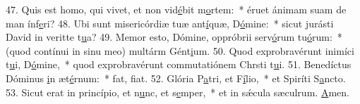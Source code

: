 47. Quis est homo, qui vivet, et non vid\uline{é}bit m\uline{o}rtem:~* éruet ánimam suam de man ínf\uline{e}ri?
48. Ubi sunt misericórdiæ tuæ ant\uline{í}quæ, D\uline{ó}mine:~* sicut jurásti David in veritte t\uline{u}a?
49. Memor esto, Dómine, oppróbrii serv\uline{ó}rum tu\uline{ó}rum:~* (quod contínui in sinu meo) multárm Gént\uline{i}um.
50. Quod exprobravérunt inimíci t\uline{u}i, D\uline{ó}mine,~* quod exprobravérunt commutatiónem Chrsti t\uline{u}i.
51. Benedíctus Dóminus \uline{i}n æt\uline{é}rnum:~* fat, f\uline{i}at.
52. Glória P\uline{a}tri, et F\uline{í}lio,~* et Spiríti S\uline{a}ncto.
53. Sicut erat in princípio, et n\uline{u}nc, et s\uline{e}mper,~* et in sǽcula sæculrum. \uline{A}men.
